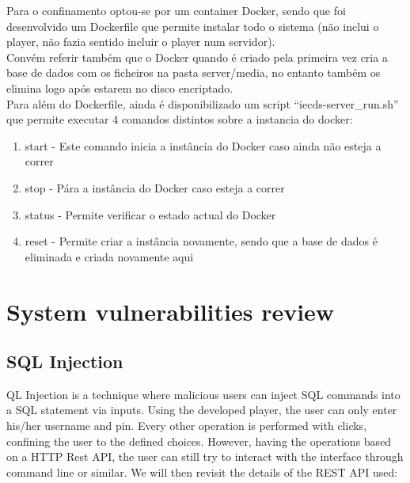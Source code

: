 \documentclass[11pt,a4paper]{report}
\begin{document}
Para o confinamento optou-se por um container Docker, sendo que foi desenvolvido um Dockerfile que permite instalar todo o sistema (não inclui o player, não fazia sentido incluir o player num servidor).\\
Convém referir também que o Docker quando é criado pela primeira vez cria a base de dados com os ficheiros na pasta server/media, no entanto também os elimina logo após estarem no disco encriptado.\\
Para além do Dockerfile, ainda é disponibilizado um script ``iecds-server\_run.sh'' que permite executar 4 comandos distintos sobre a instancia do docker:
\begin{enumerate}
\item start - Este comando inicia a instância do Docker caso ainda não esteja a correr
\item stop - Pára a instância do Docker caso esteja a correr
\item status - Permite verificar o estado actual do Docker
\item reset - Permite criar a instância novamente, sendo que a base de dados é eliminada e criada novamente aqui
\end{enumerate}

\chapter{System vulnerabilities review}
\section{SQL Injection}
QL Injection is a technique where malicious users can inject SQL commands into a SQL statement via inputs.
\newline
Using the developed player, the user can only enter his/her username and pin. Every other operation is performed with clicks, confining the user to the defined choices.
\newline
However, having the operations based on a HTTP Rest API, the user can still try to interact with the interface through command line or similar. We will then revisit the details of the REST API used:
\end{document}
